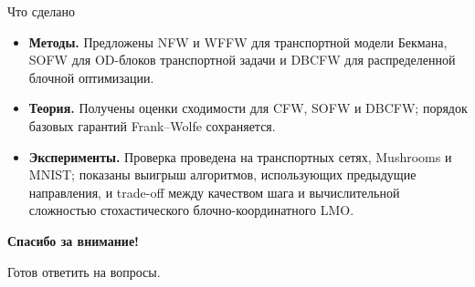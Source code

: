 \documentclass{beamer}
\begin{document}
\begin{frame}{Что сделано}
    \small
    \begin{itemize}
        \item \textbf{Методы.} Предложены NFW и WFFW для транспортной модели Бекмана, SOFW для OD-блоков транспортной задачи и DBCFW для распределенной блочной оптимизации.
        \item \textbf{Теория.} Получены оценки сходимости для CFW, SOFW и DBCFW; порядок базовых гарантий Frank--Wolfe сохраняется.
        \item \textbf{Эксперименты.} Проверка проведена на транспортных сетях, Mushrooms и MNIST; показаны выигрыш алгоритмов, использующих предыдущие направления, и trade-off между качеством шага и вычислительной сложностью стохастического блочно-координатного LMO.
    \end{itemize}

    \vspace{5mm}
    \begin{center}
        \large \textbf{Спасибо за внимание!}

        \vspace{3mm}
        \normalsize Готов ответить на вопросы.
    \end{center}
\end{frame}
\end{document}
